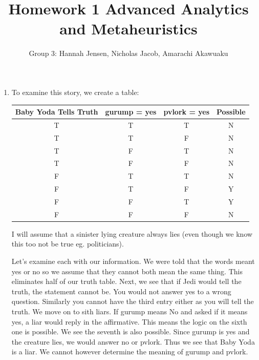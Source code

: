 \documentclass[11pt]{article}
\author{Group 3:  Hannah Jensen, Nicholas Jacob, Amarachi Akawuaku}
\title{Homework 1 Advanced Analytics and Metaheuristics}
\begin{document}
\maketitle
%
\begin{enumerate}
\item To examine this story, we create a table:  
\begin{center}
\begin{tabular}{c|c|c|c}
Baby Yoda Tells Truth&gurump = yes&pvlork = yes& Possible\\ \hline
T&T& T&N\\
T&T&F&N\\
T &F &T&N\\
T&F&F&N\\
F&T&T&N\\
F&T&F&Y\\
F&F&T&Y\\
F&F&F&N

\end{tabular}
\end{center}

I will assume that a sinister lying creature always lies (even though we know this too not be true eg. politicians).  

Let's examine each with our information.  We were told that the words meant yes or no so we assume that they cannot both mean the same thing.  This eliminates half of our truth table.  Next, we see that if Jedi would tell the truth, the statement cannot be.  You would not answer yes to a wrong question.  Similarly you cannot have the third entry either as you will tell the truth.  We move on to sith liars.  If gurump means No and asked if it means yes, a liar would reply in the affirmative.  This means the logic on the sixth one is possible.  We see the seventh is also possible.  Since gurump is yes and the creature lies, we would answer no or pvlork.  Thus we see that Baby Yoda is a liar.  We cannot however determine the meaning of gurump and pvlork.



\end{enumerate}
\end{document}
